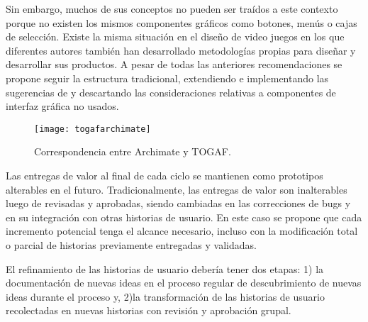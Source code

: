 Sin embargo, muchos de sus conceptos no pueden ser traídos a este contexto porque no existen los mismos componentes gráficos como botones, menús o cajas de selección. Existe la misma situación en el diseño de video juegos en los que diferentes autores también han desarrollado metodologías propias para diseñar y desarrollar sus productos. A pesar de todas las anteriores recomendaciones se propone seguir la estructura tradicional, extendiendo e implementando las sugerencias de \cite{moreno2012agile} y descartando las consideraciones relativas a componentes de interfaz gráfica no usados.

\begin{figure}[h]
\label{togafarchimate}
\centering
\texttt{[image: togafarchimate]}
\caption{Correspondencia entre Archimate y TOGAF.}
\end{figure}

Las entregas de valor al final de cada ciclo se mantienen como prototipos alterables en el futuro. Tradicionalmente, las entregas de valor son inalterables luego de revisadas y aprobadas, siendo cambiadas en las correcciones de bugs y en su integración con otras historias de usuario. En este caso se propone que cada incremento potencial tenga el alcance necesario, incluso con la modificación total o parcial de historias previamente entregadas y validadas.

El refinamiento de las historias de usuario debería tener dos etapas: 1) la documentación de nuevas ideas en el proceso regular de descubrimiento de nuevas ideas durante el proceso y, 2)la transformación de las historias de usuario recolectadas en nuevas historias con revisión y aprobación grupal.
